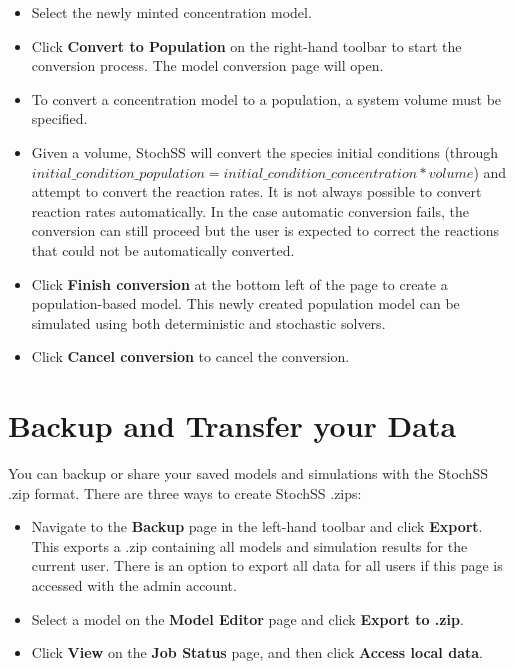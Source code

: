 \begin{itemize}
  \item Select the newly minted concentration model.
  \item Click \textbf{Convert to Population} on the right-hand toolbar to start the conversion process. The model conversion page will open.
  \item To convert a concentration model to a population, a system volume must be specified.
  \item Given a volume, StochSS will convert the species initial conditions (through $initial\_condition\_population = initial\_condition\_concentration * volume$) and attempt to convert the reaction rates. It is not always possible to convert reaction rates automatically. In the case automatic conversion fails, the conversion can still proceed but the user is expected to correct the reactions that could not be automatically converted.
  \item Click \textbf{Finish conversion} at the bottom left of the page to create a population-based model. This newly created population model can be simulated using both deterministic and stochastic solvers.
  \item Click \textbf{Cancel conversion} to cancel the conversion.
\end{itemize}


\section{Backup and Transfer your Data}
You can backup or share your saved models and simulations with the StochSS .zip format. There are three ways to create StochSS .zips:

\begin{itemize}
\item Navigate to the \textbf{Backup} page in the left-hand toolbar and click \textbf{Export}. This exports a .zip containing all models and simulation results for the current user. There is an option to export all data for all users if this page is accessed with the admin account.
\item Select a model on the \textbf{Model Editor} page and click \textbf{Export to .zip}.
\item Click \textbf{View} on the \textbf{Job Status} page, and then click \textbf{Access local data}.
\end{itemize}

